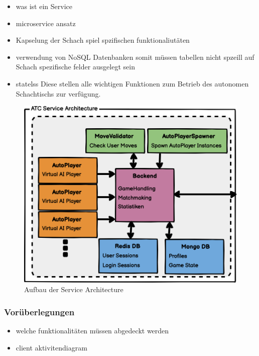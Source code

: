 \begin{itemize}
\tightlist
\item
  was ist ein Service
\item
  microservice ansatz
\item
  Kapselung der Schach spiel spzifischen funktionaliutäten
\item
  verwendung von NoSQL Datenbanken somit müssen tabellen nicht spzeill
  auf Schach spezifische felder ausgelegt sein
\item
  statelss Diese stellen alle wichtigen Funktionen zum Betrieb des
  autonomen Schachtischs zur verfügung.
\end{itemize}

\begin{figure}
\centering
\includegraphics{images/ATC_Service_Architecture.png}
\caption{Aufbau der Service Architecture}
\end{figure}

\hypertarget{voruxfcberlegungen}{%
\subsubsection{Vorüberlegungen}\label{voruxfcberlegungen}}

\begin{itemize}
\tightlist
\item
  welche funktionalitäten müssen abgedeckt werden
\item
  client aktivitendiagram
\end{itemize}

